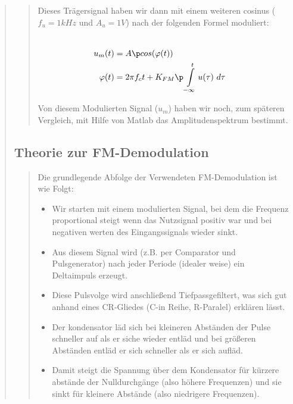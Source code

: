 \begin{quote}
\begin{quote}
        
        Dieses Trägersignal haben wir dann mit einem weiteren cosinus ($f_u = 1kHz$ und $A_u = 1V$) nach der folgenden Formel
        moduliert:
        
        \begin{equation*}
        \begin{split}
        \\
                u_m(t) &= A \p cos(\varphi(t))
        \\
            \varphi(t) &= 2 \pi f_c t + K_{FM} \p \int\limits_{-\infty}^t u(\tau) \ d\tau  
        \\
        \end{split}
        \end{equation*}
        \label{equ:fm}
        
        Von diesem Modulierten Signal ($u_m$) haben wir noch, zum späteren Vergleich, mit Hilfe von Matlab das Amplitudenspektrum
        bestimmt.
        
        
    \end{quote}
    
    
    \subsection{Theorie zur FM-Demodulation}
    \begin{quote}
        
        Die grundlegende Abfolge der Verwendeten FM-Demodulation ist wie Folgt:\\
        \vspace{0.1em}
        
        \begin{itemize}
          \item Wir starten mit einem modulierten Signal, bei dem die Frequenz proportional steigt wenn das Nutzsignal positiv war
                und bei negativen werten des Eingangssignals wieder sinkt.
          \item Aus diesem Signal wird (z.B. per Comparator und Pulsgenerator) nach jeder Periode (idealer weise) ein Deltaimpuls
                erzeugt.
          \item Diese Pulsvolge wird anschließend Tiefpassgefiltert, was sich gut anhand eines CR-Gliedes (C-in Reihe, R-Paralel)
                erklären lässt.
          \item Der kondensator läd sich bei kleineren Abständen der Pulse schneller auf als er siche wieder entläd und bei
                größeren Abständen entläd er sich schneller als er sich aufläd.
          \item Damit steigt die Spannung über dem Kondensator für kürzere abstände der Nulldurchgänge (also höhere Frequenzen)
                und sie sinkt für kleinere Abstände (also niedrigere Frequenzen).\\
        \end{itemize}
        

\end{quote}
\end{quote}
